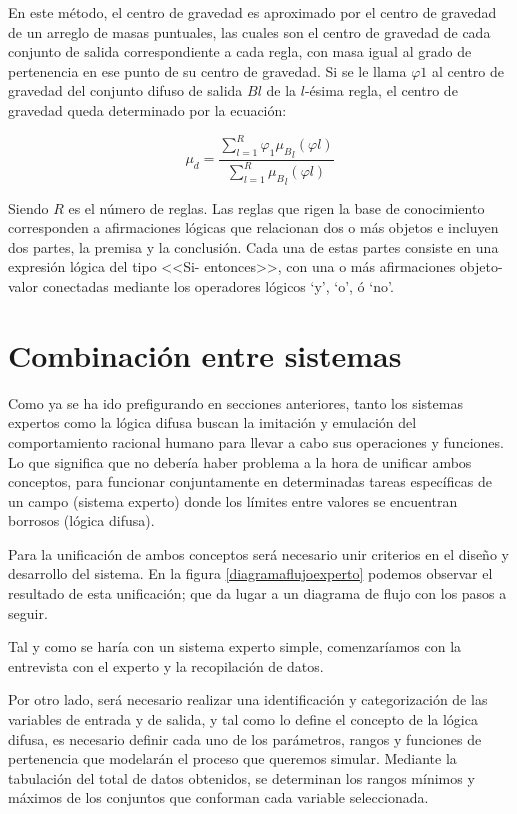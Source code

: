 \documentclass[a4paper, 11pt, titlepage]{article}
\begin{document}
        En este método, el centro de gravedad es aproximado por el centro de gravedad de un arreglo de 
        masas puntuales, las cuales son el centro de gravedad de cada conjunto de salida correspondiente 
        a cada regla, con masa igual al grado de pertenencia en ese punto de su centro de gravedad. Si 
        se le llama $\varphi 1$ al centro de gravedad del conjunto difuso de salida $Bl$ de la $l$-ésima regla, el 
        centro de gravedad queda determinado por la ecuación:

        \[
            \mu_d=\frac{\displaystyle\sum_{l=1}^{R} \varphi_1 {{\mu_B}_l(\varphi l)}}{\displaystyle\sum_{l=1}^{R}{{\mu_B}_l(\varphi l)}}
        \]

        Siendo $R$ es el número de reglas. Las reglas que rigen la base de conocimiento corresponden a 
        afirmaciones lógicas que relacionan dos o más objetos e incluyen dos partes, la premisa y la 
        conclusión. Cada una de estas partes consiste en una expresión lógica del tipo <<Si- entonces>>, 
        con una o más afirmaciones objeto-valor conectadas mediante los operadores lógicos ‘y’, ‘o’, ó 
        ‘no’. 

\section{Combinación entre sistemas}

    Como ya se ha ido prefigurando en secciones anteriores, tanto los sistemas expertos como la lógica 
    difusa buscan la imitación y emulación del comportamiento racional humano para llevar a cabo sus 
    operaciones y funciones. Lo que significa que no debería haber problema a la hora de unificar ambos 
    conceptos, para funcionar conjuntamente en determinadas tareas específicas de un campo (sistema 
    experto) donde los límites entre valores se encuentran borrosos (lógica difusa).

    Para la unificación de ambos conceptos será necesario unir criterios en el diseño y desarrollo del 
    sistema. En la figura \ref{diagramaflujoexperto} podemos observar el resultado de esta unificación; 
    que da lugar a un diagrama de flujo con los pasos a seguir. 

    Tal y como se haría con un sistema experto simple, comenzaríamos con la entrevista con el experto y 
    la recopilación de datos. 

    Por otro lado, será necesario realizar una identificación y categorización de las variables de entrada 
    y de salida, y tal como lo define el concepto 
    de la lógica difusa, es necesario definir cada uno de los parámetros, rangos y funciones de 
    pertenencia que modelarán el proceso que queremos simular. Mediante la tabulación del total de datos 
    obtenidos, se determinan los rangos mínimos y máximos de los conjuntos que conforman cada 
    variable seleccionada.
\end{document}
